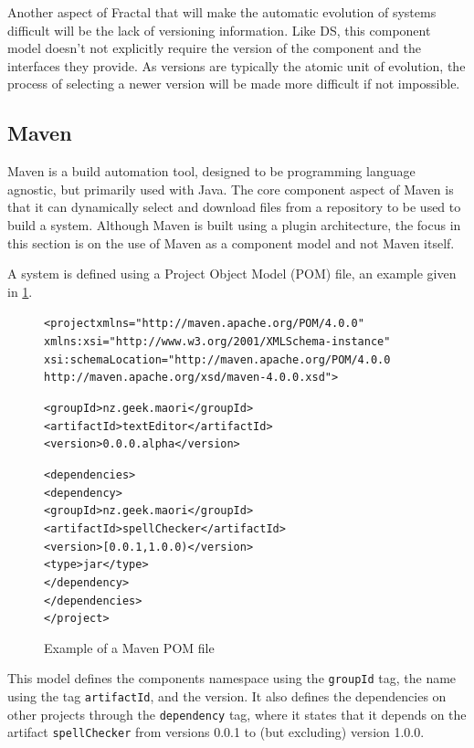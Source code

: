 Another aspect of Fractal that will make the automatic evolution of systems difficult will be the lack of versioning information.
Like DS, this component model doesn't not explicitly require the version of the component and the interfaces they provide.
As versions are typically the atomic unit of evolution, the process of selecting a newer version will be made more difficult if not impossible. 

\subsection{Maven}
Maven is a build automation tool, designed to be programming language agnostic, but primarily used with Java.
The core component aspect of Maven is that it can dynamically select and download files from a repository to be used to build a system.
Although Maven is built using a plugin architecture, the focus in this section is on the use of Maven as a component model and not Maven itself.

A system is defined using a Project Object Model (POM) file, an example given in \ref{mavenmetadata}. 

\begin{figure}[htp]
\begin{center}
\begin{alltt}
<project xmlns="http://maven.apache.org/POM/4.0.0"
  xmlns:xsi="http://www.w3.org/2001/XMLSchema-instance"
  xsi:schemaLocation="http://maven.apache.org/POM/4.0.0
                      http://maven.apache.org/xsd/maven-4.0.0.xsd">

  <groupId>nz.geek.maori</groupId>
  <artifactId>textEditor</artifactId>
  <version>0.0.0.alpha</version>

  <dependencies>
    <dependency>
      <groupId>nz.geek.maori</groupId>
      <artifactId>spellChecker</artifactId>
      <version>[0.0.1,1.0.0)</version>
      <type>jar</type>
     </dependency>
  </dependencies>
</project>
\end{alltt}
  \caption[Maven POM file]{Example of a Maven POM file}
  \label{mavenmetadata}
\end{center}
\end{figure}

This model defines the components namespace using the \verb+groupId+ tag, the name using the tag \verb+artifactId+, and the version.
It also defines the dependencies on other projects through the \verb+dependency+ tag,
where it states that it depends on the artifact \verb+spellChecker+ from versions 0.0.1 to (but excluding) version 1.0.0.

